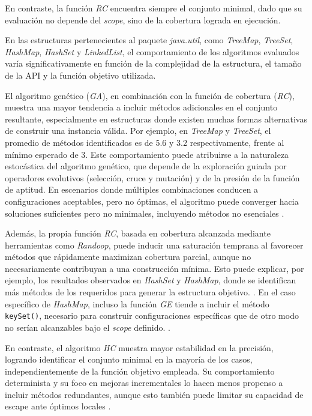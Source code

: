 En contraste, la función \emph{RC} encuentra siempre el conjunto minimal, dado que su
evaluación no depende del \emph{scope}, sino de la cobertura lograda en
ejecución.

En las estructuras pertenecientes al paquete \emph{java.util}, como \emph{TreeMap}, \emph{TreeSet}, \emph{HashMap}, \emph{HashSet} y \emph{LinkedList}, 
el comportamiento de los algoritmos evaluados varía significativamente en función de la complejidad de la estructura, 
el tamaño de la API y la función objetivo utilizada.

El algoritmo genético (\emph{GA}), en combinación con la función de cobertura (\emph{RC}), muestra una mayor tendencia a incluir métodos 
adicionales en el conjunto resultante, especialmente en estructuras donde existen muchas formas alternativas de construir una instancia válida. 
Por ejemplo, en \emph{TreeMap} y \emph{TreeSet}, el promedio de métodos identificados es de 5.6 y 3.2 respectivamente, 
frente al mínimo esperado de 3. Este comportamiento puede atribuirse a la naturaleza estocástica del algoritmo genético,
que depende de la exploración guiada por operadores evolutivos (selección, cruce y mutación) y de la presión de la función de aptitud. 
En escenarios donde múltiples combinaciones conducen a configuraciones aceptables, pero no óptimas, el algoritmo puede converger 
hacia soluciones suficientes pero no minimales, incluyendo métodos no esenciales
.

Además, la propia función \emph{RC}, basada en cobertura alcanzada mediante herramientas como \emph{Randoop}, 
puede inducir una saturación temprana al favorecer métodos que rápidamente maximizan cobertura parcial, 
aunque no necesariamente contribuyan a una construcción mínima. Esto puede explicar, por ejemplo, los resultados observados en \emph{HashSet} y \emph{HashMap}, 
donde se identifican más métodos de los requeridos para generar la estructura
objetivo. .
En el caso específico de \emph{HashMap}, incluso la función \emph{GE} tiende a incluir el método \texttt{keySet()}, 
necesario para construir configuraciones específicas que de otro modo no serían alcanzables bajo el \emph{scope} definido. .

En contraste, el algoritmo \emph{HC} muestra mayor estabilidad en la precisión, 
logrando identificar el conjunto minimal en la mayoría de los casos, 
independientemente de la función objetivo empleada. Su comportamiento determinista y 
su foco en mejoras incrementales lo hacen menos propenso a incluir métodos redundantes, 
aunque esto también puede limitar su capacidad de escape ante óptimos locales .

